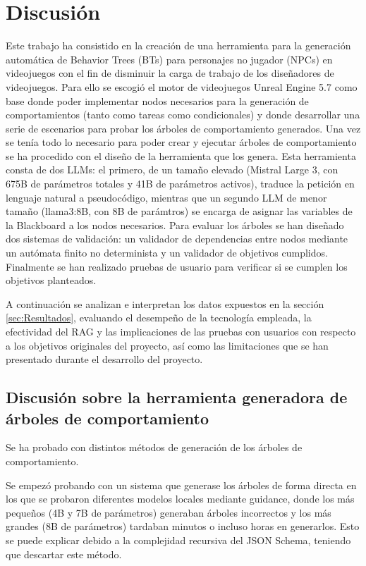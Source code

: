\chapter{Discusión}
\label{cap:Discusion}

Este trabajo ha consistido en la creación de una herramienta para la generación automática de Behavior Trees (BTs) para personajes no jugador (NPCs) en videojuegos con el fin de disminuir la carga de trabajo de los diseñadores de videojuegos.
Para ello se escogió el motor de videojuegos Unreal Engine 5.7 como base donde poder implementar nodos necesarios para la generación de comportamientos (tanto como tareas como condicionales) y donde desarrollar una serie de escenarios para probar los árboles de comportamiento generados.
Una vez se tenía todo lo necesario para poder crear y ejecutar árboles de comportamiento se ha procedido con el diseño de la herramienta que los genera. 
Esta herramienta consta de dos LLMs: el primero, de un tamaño elevado (Mistral Large 3, con 675B de parámetros totales y 41B de parámetros activos), traduce la petición en lenguaje natural a pseudocódigo, mientras que un segundo LLM de menor tamaño (llama3:8B, con 8B de parámtros) se encarga de asignar las variables de la Blackboard a los nodos necesarios.
Para evaluar los árboles se han diseñado dos sistemas de validación: un validador de dependencias entre nodos mediante un autómata finito no determinista y un validador de objetivos cumplidos.
Finalmente se han realizado pruebas de usuario para verificar si se cumplen los objetivos planteados.

A continuación se analizan e interpretan los datos expuestos en la sección \ref{sec:Resultados}, evaluando el desempeño de la tecnología empleada, la efectividad del RAG y las implicaciones de las pruebas con usuarios con respecto a los objetivos originales del proyecto, así como las limitaciones que se han presentado durante el desarrollo del proyecto.

\section{Discusión sobre la herramienta generadora de árboles de comportamiento}
Se ha probado con distintos métodos de generación de los árboles de comportamiento.

Se empezó probando con un sistema que generase los árboles de forma directa en los que se probaron diferentes modelos locales mediante guidance, donde los más pequeños (4B y 7B de parámetros) generaban árboles incorrectos y los más grandes (8B de parámetros) tardaban minutos o incluso horas en generarlos.
Esto se puede explicar debido a la complejidad recursiva del JSON Schema, teniendo que descartar este método.

